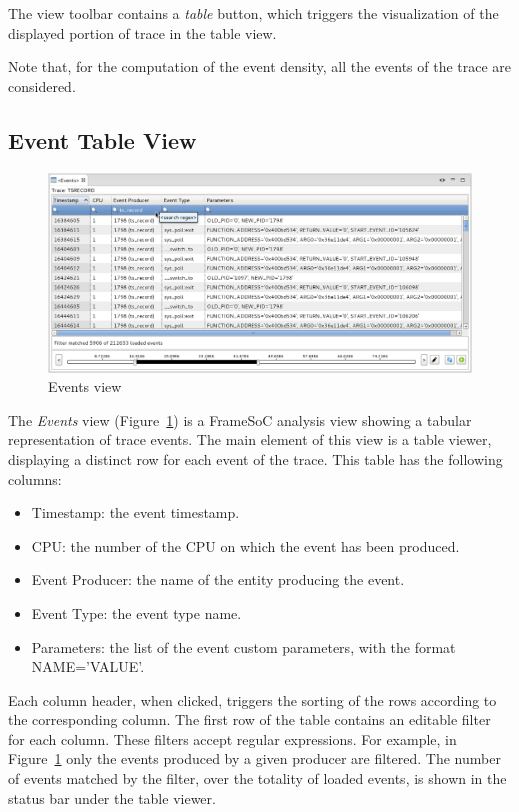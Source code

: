 \documentclass[twoside]{article}
\begin{document}
\begin{sloppypar}
The view toolbar contains a \emph{table} button, which triggers the visualization of the displayed portion of trace in the table view.

Note that, for the computation of the event density, all the events of the trace are considered.

\subsection{Event Table View}
\label{subsec:table}

\begin{figure}[h!]
  \centering
    \includegraphics[width=1.0\textwidth]{images/table_nocategory.png}
  \caption{Events view}
  \label{fig:table_regex}
\end{figure}

The \emph{Events} view (Figure~\ref{fig:table_regex}) is a FrameSoC analysis view showing a tabular representation of trace events.
The main element of this view is a table viewer, displaying a distinct row for each event of the trace.
This table has the following columns:
\begin{itemize}
 \item Timestamp: the event timestamp.
 \item CPU: the number of the CPU on which the event has been produced.
 \item Event Producer: the name of the entity producing the event.
 \item Event Type: the event type name.
 \item Parameters: the list of the event custom parameters, with the format NAME='VALUE'.
\end{itemize}
Each column header, when clicked, triggers the sorting of the rows according to the corresponding column. 
The first row of the table contains an editable filter for each column. 
These filters accept regular expressions.
For example, in Figure~\ref{fig:table_regex} only the events produced by a given producer are filtered.
The number of events matched by the filter, over the totality of loaded events, is shown in the status bar under the table viewer.


\end{sloppypar}
\end{document}
